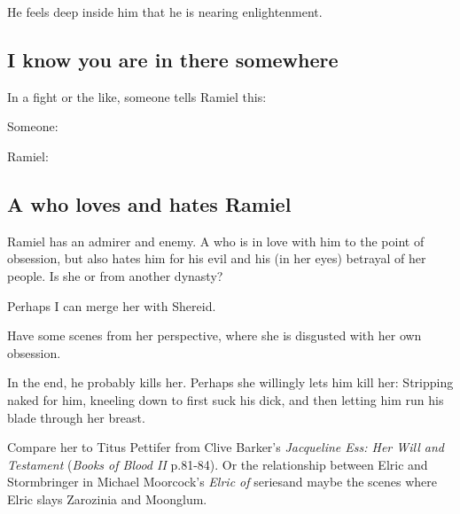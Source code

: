 He feels deep inside him that he is nearing enlightenment. 







\subsection{I know you are in there somewhere}
In a fight or the like, someone tells Ramiel this: 

\begin{prose}
  Someone: 
  
  Ramiel: 
\end{prose}







\subsection{A \resvil{} who loves and hates Ramiel}
Ramiel has an admirer and enemy. A \resvil{} who is in love with him to the point of obsession, but also hates him for his evil and his (in her eyes) betrayal of her people. Is she \Mystraacht{} or from another dynasty?

Perhaps I can merge her with Shereid. 

Have some scenes from her perspective, where she is disgusted with her own obsession. 

In the end, he probably kills her. Perhaps she willingly lets him kill her: Stripping naked for him, kneeling down to first suck his dick, and then letting him run his blade through her breast. 

Compare her to Titus Pettifer from Clive Barker's \emph{Jacqueline Ess: Her Will and Testament} (\emph{Books of Blood II} p.81-84). Or the relationship between Elric and Stormbringer in Michael Moorcock's \emph{Elric of \Melnibone} series\dash and maybe the scenes where Elric slays Zarozinia and Moonglum. 















